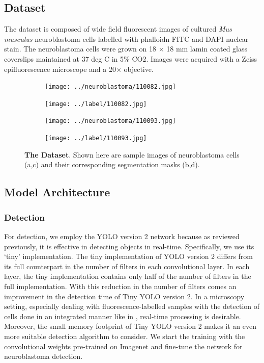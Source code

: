 \documentclass[journal]{IEEEtran}
\begin{document}
\subsection{Dataset}
The dataset is composed of wide field fluorescent images of cultured \textit{Mus musculus} neuroblastoma cells labelled with phalloidn FITC and DAPI nuclear stain. The neuroblastoma cells were grown on 18 $\times$ 18 mm lamin coated glass coverslips maintained at 37 deg C in 5\% CO2. Images were acquired with a Zeiss epifluorescence microscope and a 20$\times$ objective.
\begin{figure}
\centering
\begin{subfigure}[b]{0.24\linewidth}
\texttt{[image: ../neuroblastoma/110082.jpg]}
\caption{}
\end{subfigure}
\begin{subfigure}[b]{0.24\linewidth}
\texttt{[image: ../label/110082.jpg]}
\caption{}
\end{subfigure}
\begin{subfigure}[b]{0.24\linewidth}
\texttt{[image: ../neuroblastoma/110093.jpg]}
\caption{}
\end{subfigure}
\begin{subfigure}[b]{0.24\linewidth}
\texttt{[image: ../label/110093.jpg]}
\caption{}
\end{subfigure}
\caption{\textbf{The Dataset}. Shown here are sample images of neuroblastoma cells (a,c) and their corresponding segmentation masks (b,d). }
\end{figure}
\subsection{Model Architecture}
\subsubsection{Detection}
For detection, we employ the YOLO version 2 network because as reviewed previously, it is effective in detecting objects in real-time. Specifically, we use its `tiny' implementation. The tiny implementation of YOLO version 2 differs from its full counterpart in the number of filters in each convolutional layer. In each layer, the tiny implementation contains only half of the number of filters in the full implementation. With this reduction in the number of filters comes an improvement in the detection time of Tiny YOLO version 2. In a microscopy setting, especially dealing with fluorescence-labelled samples with the detection of cells done in an integrated manner like in \cite{Waithe544833}, real-time processing is desirable. Moreover, the small memory footprint of Tiny YOLO version 2 makes it an even more suitable detection algorithm to consider. We start the training with the convolutional weights pre-trained on Imagenet and fine-tune the network for neuroblastoma detection.
\end{document}
